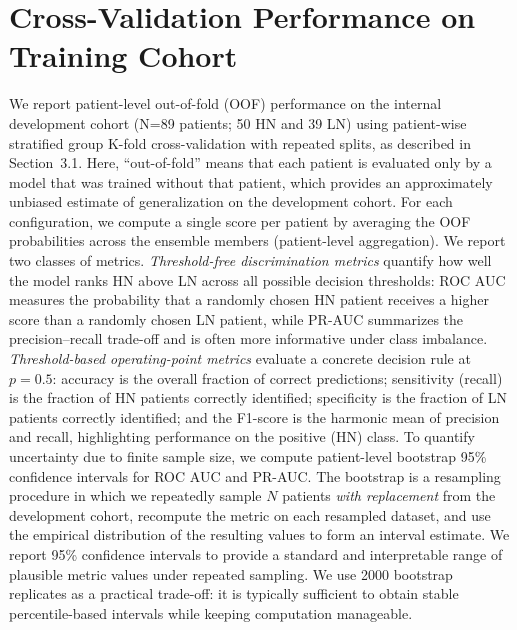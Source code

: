\section{Cross-Validation Performance on Training Cohort}
\label{sec:cv_performance}

We report patient-level out-of-fold (OOF) performance on the internal development cohort (N=89 patients; 50 HN and 39 LN) using patient-wise stratified group K-fold cross-validation with repeated splits, as described in Section~3.1. Here, ``out-of-fold'' means that each patient is evaluated only by a model that was trained without that patient, which provides an approximately unbiased estimate of generalization on the development cohort. For each configuration, we compute a single score per patient by averaging the OOF probabilities across the ensemble members (patient-level aggregation).
We report two classes of metrics. \emph{Threshold-free discrimination metrics} quantify how well the model ranks HN above LN across all possible decision thresholds: ROC AUC measures the probability that a randomly chosen HN patient receives a higher score than a randomly chosen LN patient, while PR-AUC summarizes the precision--recall trade-off and is often more informative under class imbalance. \emph{Threshold-based operating-point metrics} evaluate a concrete decision rule at $p=0.5$: accuracy is the overall fraction of correct predictions; sensitivity (recall) is the fraction of HN patients correctly identified; specificity is the fraction of LN patients correctly identified; and the F1-score is the harmonic mean of precision and recall, highlighting performance on the positive (HN) class.
To quantify uncertainty due to finite sample size, we compute patient-level bootstrap 95\% confidence intervals for ROC AUC and PR-AUC. The bootstrap is a resampling procedure in which we repeatedly sample $N$ patients \emph{with replacement} from the development cohort, recompute the metric on each resampled dataset, and use the empirical distribution of the resulting values to form an interval estimate. We report 95\% confidence intervals to provide a standard and interpretable range of plausible metric values under repeated sampling. We use 2000 bootstrap replicates as a practical trade-off: it is typically sufficient to obtain stable percentile-based intervals while keeping computation manageable.


